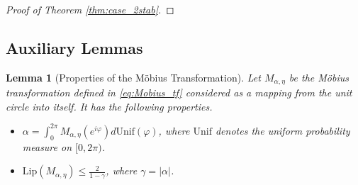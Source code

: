 \documentclass[10pt]{article}
\newtheorem{lemma}[theorem]{Lemma}
\theoremstyle{definition}
\theoremstyle{definition}
\numberwithin{equation}{section}
\newcommand{\Unif}{\mathrm{Unif}}
\newcommand{\OA}{\mathrm{OA}}
\begin{document}
\begin{proof}[Proof of Theorem \ref{thm:case_2stab}]

\end{proof}

\subsection{Auxiliary Lemmas}

\begin{lemma}[Properties of the Möbius Transformation]\label{lem:Mobius_tf_properties}
Let $M_{\alpha, \eta}$ be the Möbius transformation defined in \eqref{eq:Mobius_tf} considered as a mapping from the unit circle into itself.
It has the following properties.
\begin{itemize}
    \item[(i).] 
    $\alpha = \int_0^{2\pi} M_{\alpha, \eta} (e^{i\varphi}) d\Unif(\varphi)$, where $\Unif$ denotes the uniform probability measure on $[0, 2\pi)$.
    \item[(ii).] $\mathrm{Lip} (M_{\alpha, \eta}) \leq \frac{2}{1 - \gamma}$, where $\gamma=|\alpha|$.
\end{itemize}
\end{lemma}
\end{document}
